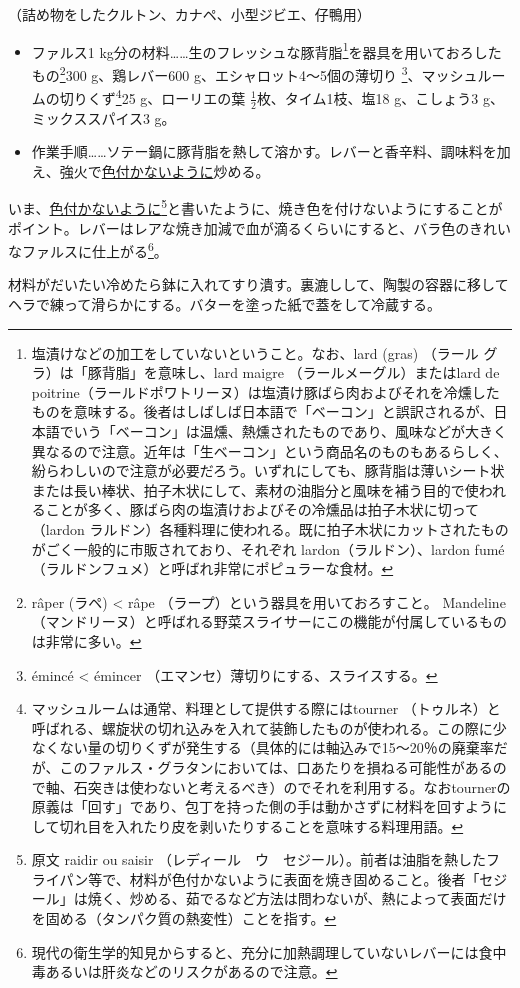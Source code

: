 \begin{recette}


（詰め物をしたクルトン、カナペ、小型ジビエ、仔鴨用）

\begin{itemize}
\item
  ファルス1 kg分の材料\ldots{}\ldots{}生のフレッシュな豚背脂\footnote{塩漬けなどの加工をしていないということ。なお、lard
    (gras) （ラール グラ）は「豚背脂」を意味し、lard maigre
    （ラールメーグル）またはlard de
    poitrine（ラールドポワトリーヌ）は塩漬け豚ばら肉およびそれを冷燻したものを意味する。後者はしばしば日本語で「ベーコン」と誤訳されるが、日本語でいう「ベーコン」は温燻、熱燻されたものであり、風味などが大きく異なるので注意。近年は「生ベーコン」という商品名のものもあるらしく、紛らわしいので注意が必要だろう。いずれにしても、豚背脂は薄いシート状または長い棒状、拍子木状にして、素材の油脂分と風味を補う目的で使われることが多く、豚ばら肉の塩漬けおよびその冷燻品は拍子木状に切って（lardon
    ラルドン）各種料理に使われる。既に拍子木状にカットされたものがごく一般的に市販されており、それぞれ
    lardon（ラルドン）、lardon
    fumé（ラルドンフュメ）と呼ばれ非常にポピュラーな食材。}を器具を用いておろしたもの\footnote{râper
    (ラペ) \textless{} râpe （ラープ）という器具を用いておろすこと。
    Mandeline
    （マンドリーヌ）と呼ばれる野菜スライサーにこの機能が付属しているものは非常に多い。}300
  g、鶏レバー600 g、エシャロット4〜5個の薄切り \footnote{émincé
    \textless{} émincer （エマンセ）薄切りにする、スライスする。}、マッシュルームの切りくず\footnote{マッシュルームは通常、料理として提供する際にはtourner
    （トゥルネ）と呼ばれる、螺旋状の切れ込みを入れて装飾したものが使われる。この際に少なくない量の切りくずが発生する（具体的には軸込みで15〜20％の廃棄率だが、このファルス・グラタンにおいては、口あたりを損ねる可能性があるので軸、石突きは使わないと考えるべき）のでそれを利用する。なおtournerの原義は「回す」であり、包丁を持った側の手は動かさずに材料を回すようにして切れ目を入れたり皮を剥いたりすることを意味する料理用語。}25
  g、ローリエの葉 \(\frac{1}{2}\)枚、タイム1枝、塩18 g、こしょう3
  g、ミックススパイス3 g。
\item
  作業手順\ldots{}\ldots{}ソテー鍋に豚背脂を熱して溶かす。レバーと香辛料、調味料を加え、強火で\ul{色付かないように}炒める。
\end{itemize}

いま、\ul{色付かないように}\footnote{原文 raidir ou saisir
  （レディール　ウ　セジール）。前者は油脂を熱したフライパン等で、材料が色付かないように表面を焼き固めること。後者「セジール」は焼く、炒める、茹でるなど方法は問わないが、熱によって表面だけを固める（タンパク質の熱変性）ことを指す。}と書いたように、焼き色を付けないようにすることがポイント。レバーはレアな焼き加減で血が滴るくらいにすると、バラ色のきれいなファルスに仕上がる\footnote{現代の衛生学的知見からすると、充分に加熱調理していないレバーには食中毒あるいは肝炎などのリスクがあるので注意。}。

材料がだいたい冷めたら鉢に入れてすり潰す。裏漉しして、陶製の容器に移してヘラで練って滑らかにする。バターを塗った紙で蓋をして冷蔵する。
\end{recette}
